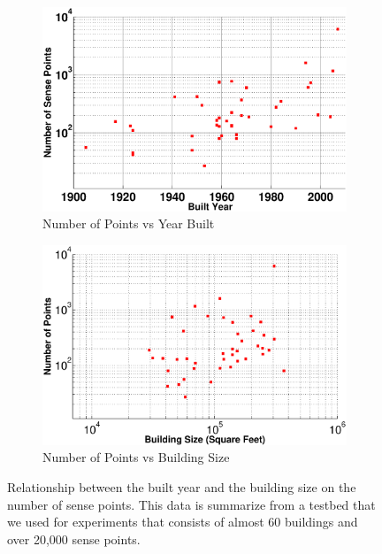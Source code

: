 \begin{figure}[htb!]
\centering
	\begin{subfigure}{0.48\textwidth}
                \centering
		\includegraphics[width=\textwidth]{./figs/pts_vs_yearbuilt.eps}
                \caption{Number of Points vs Year Built}
                \label{fig:sense_pts_data_yb}
	\end{subfigure}
	\begin{subfigure}{0.48\textwidth}
                \centering
		\includegraphics[width=\textwidth]{./figs/pts_vs_buildsz.eps}
                \caption{Number of Points vs Building Size}
                \label{fig:sense_pts_data_bs}
	\end{subfigure}
\caption{Relationship between the built year and the building size on the number of sense
points.  This data is summarize from a testbed that we used for experiments that consists of
almost 60 buildings and over 20,000 sense points.}
\label{fig:sense_pts_data}
\end{figure}


